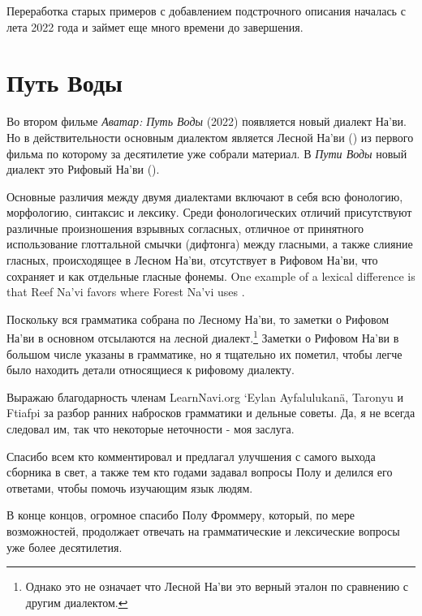Переработка старых примеров с добавлением подстрочного описания
началась с лета 2022 года и займет еще много времени до
завершения.


\section{Путь Воды}
Во втором фильме \textit{Аватар: Путь Воды} (2022) появляется
новый диалект На'ви. Но в действительности основным диалектом
является Лесной На'ви () из первого фильма по
которому за десятилетие уже собрали материал.
В \textit{Пути Воды}  новый диалект это Рифовый На'ви ().

Основные различия между двумя диалектами включают в себя всю
фонологию, морфологию, синтаксис и лексику. Среди фонологических
отличий присутствуют различные произношения взрывных согласных,
отличное от принятного использование глоттальной смычки
(дифтонга) между гласными, а также слияние гласных, происходящее
в Лесном На'ви, отсутствует в Рифовом На'ви, что сохраняет 
и  как отдельные гласные фонемы.
One example of a lexical difference is that Reef Na'vi
favors   where Forest Na'vi uses .

Поскольку вся грамматика собрана по Лесному На'ви, то заметки о
Рифовом На'ви в основном отсылаются на лесной
диалект.\footnote{Однако это не означает что Лесной На'ви это
верный эталон по сравнению с другим диалектом.}
Заметки о Рифовом На'ви в большом числе указаны в грамматике, но
я тщательно их пометил, чтобы легче было находить детали
относящиеся к рифовому диалекту.



\vfill
Выражаю благодарность членам LearnNavi.org `Eylan Ayfalulukanä,
Taronyu
и Ftiafpi за разбор ранних набросков грамматики и дельные
советы. Да, я не всегда следовал им, так что некоторые
неточности - моя заслуга.

Спасибо всем кто комментировал и предлагал улучшения с самого
выхода сборника в свет, а также тем кто годами задавал вопросы
Полу и делился его ответами, чтобы помочь изучающим язык людям.

В конце концов, огромное спасибо Полу Фроммеру, который, по мере
возможностей, продолжает отвечать на грамматические и
лексические вопросы уже более десятилетия.



\bigskip
